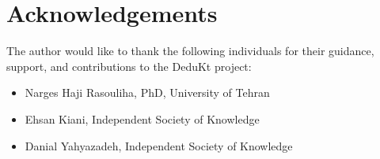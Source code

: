 \section*{Acknowledgements}

The author would like to thank the following individuals for their guidance, support, and contributions to the DeduKt project:

\begin{itemize}
    \item Narges Haji Rasouliha, PhD, University of Tehran
    \item Ehsan Kiani, Independent Society of Knowledge
    \item Danial Yahyazadeh, Independent Society of Knowledge
\end{itemize}
